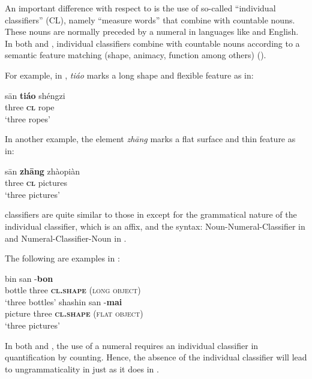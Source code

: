 \documentclass[output=paper,colorlinks,citecolor=brown,modfonts,nonflat]{../langscibook}
\begin{document}
An important difference with respect to  is the use of so-called “individual classifiers” (CL), namely “measure words” that combine with countable nouns. These nouns are normally preceded by a numeral in languages like  and English. In both  and , individual classifiers combine with countable nouns according to a semantic feature matching (shape, animacy, function among others) (\citealt{Nishio2000,Zhang2007}).

\newpage
For example, in , \textit{tiáo} marks a long shape and flexible feature as in:

\ea%
    \label{ex:watorek:13}
    \gll    sān \textbf{tiáo} shéngzi\\
            three  {\textsc{\textbf{cl}}} rope\\
    \glt    ‘three ropes’
\z

In another  example, the element \textit{zhāng} marks a flat surface and thin feature as in:

\ea%
    \label{ex:watorek:14}
    \gll    sān \textbf{{zhāng}} zhàopiàn\\
            three  {\textsc{\textbf{cl}}} pictures\\
    \glt    ‘three pictures’ 
\z

 classifiers are quite similar to those in  except for the grammatical nature of the individual classifier, which is an affix, and the syntax: Noun-Numeral-Classifier in  and Numeral-Classifier-Noun in .

The following are examples in :%

\ea%
    \label{ex:watorek:15}
    \ea%
    \label{ex:watorek:15a}
    \gll    bin san -\textbf{{bon}}\\
            bottle three {\textsc{\textbf{cl.shape} (long object)}}\\
    \glt    ‘three bottles’        
    \ex%
    \label{ex:watorek:15b}
    \gll    shashin san -\textbf{{mai}}\\
            picture three \textsc{\textbf{cl.shape} (flat object)}\\
    \glt    ‘three pictures’ 
    \z
\z

In both  and , the use of a numeral requires an individual classifier in quantification by counting. Hence, the absence of the individual classifier will lead to ungrammaticality in  just as it does in . 
\end{document}
